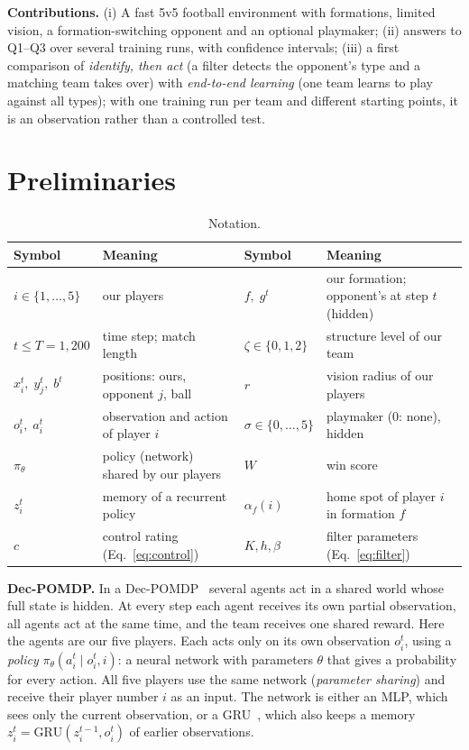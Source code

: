 \documentclass{article}
\begin{document}
\textbf{Contributions.} (i) A fast 5v5 football environment with formations, limited vision, a formation-switching
opponent and an optional playmaker; (ii) answers to Q1--Q3 over several training runs, with confidence intervals;
(iii) a first comparison of \emph{identify, then act} (a filter detects the opponent's type and a matching team takes
over) with \emph{end-to-end learning} (one team learns to play against all types); with one training run per team and
different starting points, it is an observation rather than a controlled test.


\section{Preliminaries}
\label{sec:prelim}

\begin{table}[H]
\caption{Notation.}
\label{tab:notation}
\centering
\small
\begin{tabular}{ll@{\hskip 2em}ll}
\toprule
Symbol & Meaning & Symbol & Meaning \\
\midrule
$i\in\{1,\dots,5\}$ & our players & $f,\;g^t$ & our formation; opponent's at step $t$ (hidden) \\
$t\le T=1{,}200$ & time step; match length & $\zeta\in\{0,1,2\}$ & structure level of our team \\
$x_i^t,\;y_j^t,\;b^t$ & positions: ours, opponent $j$, ball & $r$ & vision radius of our players \\
$o_i^t,\;a_i^t$ & observation and action of player $i$ & $\sigma\in\{0,\dots,5\}$ & playmaker (0: none), hidden \\
$\pi_\theta$ & policy (network) shared by our players & $W$ & win score \\
$z_i^t$ & memory of a recurrent policy & $\alpha_f(i)$ & home spot of player $i$ in formation $f$ \\
$c$ & control rating (Eq.~\ref{eq:control}) & $K,h,\beta$ & filter parameters (Eq.~\ref{eq:filter}) \\
\bottomrule
\end{tabular}
\end{table}

\textbf{Dec-POMDP.} In a Dec-POMDP~\cite{bernstein2002complexity} several agents act in a shared world whose full state
is hidden. At every step each agent receives its own partial observation, all agents act at the same time, and the team
receives one shared reward. Here the agents are our five players. Each acts only on its own observation $o_i^t$, using
a \emph{policy} $\pi_\theta(a_i^t\mid o_i^t,i)$: a neural network with parameters $\theta$ that gives a probability for
every action. All five players use the same network (\emph{parameter sharing}) and receive their player number $i$ as
an input. The network is either an MLP, which sees only the current observation, or a GRU~\cite{cho2014gru}, which also keeps a memory
$z_i^t=\mathrm{GRU}(z_i^{t-1},o_i^t)$ of earlier observations.
\end{document}
